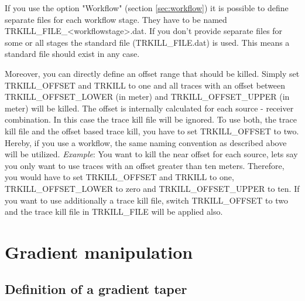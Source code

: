 If you use the option "Workflow" (section \ref{sec:workflow}) it is possible to define separate files for each workflow stage. They have to be named TRKILL\_FILE\_<workflowstage>.dat. If you don't provide separate files for some or all stages the standard file (TRKILL\_FILE.dat) is used. This means a standard file should exist in any case.

Moreover, you can directly define an offset range that should be killed. Simply set TRKILL\_OFFSET and TRKILL to one and all traces with an offset between TRKILL\_OFFSET\_LOWER (in meter) and TRKILL\_OFFSET\_UPPER (in meter) will be killed. The offset is internally calculated for each source - receiver combination.  In this case the trace kill file will be ignored. To use both, the trace kill file and the offset based trace kill, you have to set TRKILL\_OFFSET to two. Hereby, if you use a workflow, the same naming convention as described above will be utilized. 
\textit{Example}: You want to kill the near offset for each source, lets say you only want to use traces with an offset greater than ten meters. Therefore, you would have to set TRKILL\_OFFSET and TRKILL to one, TRKILL\_OFFSET\_LOWER to zero and TRKILL\_OFFSET\_UPPER to ten. If you want to use additionally a trace kill file, switch TRKILL\_OFFSET to two and the trace kill file in TRKILL\_FILE will be applied also.

\section{Gradient manipulation}
\subsection{Definition of a gradient taper}
\label{sec:Definition_of_gradient_taper_geometry}
{\color{blue}{\begin{verbatim}
"Definition of gradient taper geometry" : "comment",
			"SWS_TAPER_GRAD_VERT" : "0",
			"SWS_TAPER_GRAD_HOR" : "0",
			"GRADT1 , GRADT2 , GRADT3 , GRADT4" : "5 , 15 , 490 , 500",
			"SWS_TAPER_GRAD_SOURCES" : "0",
			"SWS_TAPER_CIRCULAR_PER_SHOT" : "0",
			"SRTSHAPE" : "1",
			"SRTRADIUS" : "5.0",
			"FILTSIZE" : "1",
			"SWS_TAPER_FILE" : "0",
			"SWS_TAPER_FILE_PER_SHOT" : "0",
			"TAPER_FILE_NAME" : "taper",
\end{verbatim}}}

{\color{red}{\begin{verbatim}
Default values are:
SWS_TAPER_GRAD_VERT=0
SWS_TAPER_GRAD_HOR=0
SWS_TAPER_GRAD_SOURCES=0
SWS_TAPER_CIRCULAR_PER_SHOT=0
SWS_TAPER_FILE=0
SWS_TAPER_FILE_PER_SHOT=0
\end{verbatim}}}

